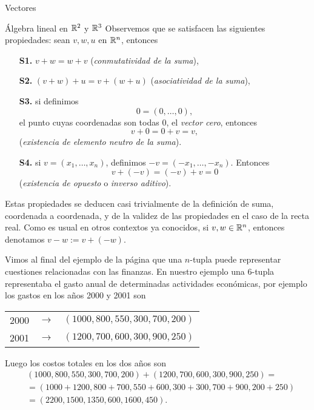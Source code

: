 \begin{chapter}{Vectores}
\begin{section}{\'Algebra lineal en $\mathbb R^2$ y $\mathbb R^3$}
        Observemos que se satisfacen las siguientes propiedades: sean $v,w,u$ en $\mathbb R^n$,  entonces
        \begin{enumerate}
        \item[\textbf{S1.}] $v + w = w + v$ (\textit{conmutatividad de la suma}),
        \item[\textbf{S2.}] $(v+ w)+ u = v + (w+u)$ (\textit{asociatividad de la suma}),
        \item[\textbf{S3.}] si definimos
        \begin{equation*}
        0 = (0,\dots,0),
        \end{equation*}
        el punto cuyas coordenadas son todas $0$, el \textit{vector cero}, entonces 
            \begin{equation*}
        v +0 = 0 +v = v,
        \end{equation*}
         (\textit{existencia de elemento neutro de la suma}).
        \item[\textbf{S4.}]si $v = (x_1,\ldots,x_n)$,  definimos $-v = (-x_1,\ldots, -x_n)$. Entonces 
        \begin{equation*}
        v + (-v) = (-v) + v = 0
        \end{equation*} 
        (\textit{existencia de opuesto} o  \textit{inverso aditivo}).
    \end{enumerate}

    Estas propiedades se deducen casi trivialmente de la definición de suma, coordenada a coordenada, y de la validez de las propiedades en el caso de la recta real. Como es usual en otros contextos ya conocidos, si $v,w \in \mathbb R^n$,  entonces denotamos $v- w := v + (-w)$.
    
    
    
    
   
    \begin{ejemplo*} 
        Vimos al final del ejemplo de la página \pageref{ej-3espacio-industria} que una $n$-tupla puede representar cuestiones relacionadas con las finanzas. En  nuestro ejemplo una 6-tupla representaba el gasto anual de determinadas actividades económicas, por ejemplo los gastos  en los años 2000 y 2001 son 
        \begin{center}
            \begin{tabular}{lcl}
                2000 \quad&$\rightarrow$\quad &$(1000, 800, 550, 300, 700, 200)$ \\
                2001 \quad&$\rightarrow$\quad &$(1200, 700, 600, 300, 900, 250)$ 
            \end{tabular} 
        \end{center}
        Luego los costos totales en los dos años son 
        \begin{align*}
            &(1000, 800, 550, 300, 700, 200) + (1200, 700, 600, 300, 900, 250) = \\
            &=(1000+1200, 800+700, 550+600, 300+300, 700+900, 200+250) \\
            &= (2200, 1500, 1350, 600, 1600, 450). 
        \end{align*} 
    \end{ejemplo*}
    

\end{section}
\end{chapter}
